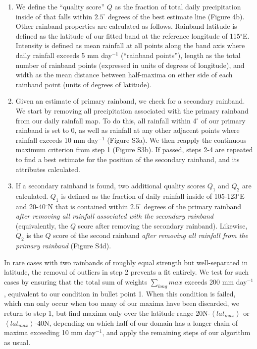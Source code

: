 \documentclass[draft,grl]{agutexSI}
\begin{document}
\begin{article}
\begin{enumerate}
	\item We define the ``quality score'' $Q$ as the fraction of total daily precipitation inside of  that falls within $2.5^{\circ}$ degrees of the best estimate line (Figure 4b). Other rainband properties are calculated as follows. Rainband latitude is defined as the latitude of our fitted band at the reference longitude of 115$^{\circ}$E. Intensity is defined as mean rainfall at all points along the band axis where daily rainfall exceeds 5 mm day$^{-1}$ (``rainband points''), length as the total number of rainband points (expressed in units of degrees of longitude), and width as the mean distance between half-maxima on either side of each rainband point (units of degrees of latitude).
	
	\item Given an estimate of primary rainband, we check for a secondary rainband. We start by removing all precipitation associated with the primary rainband from our daily rainfall map. To do this, all rainfall within 4$^{\circ}$ of our primary rainband is set to 0, as well as rainfall at any other adjacent points where rainfall exceeds 10 mm day$^{-1}$ (Figure S3a). We then reapply the continuous maximum criterion from step 1 (Figure S3b). If passed, steps 2-4 are repeated to find a best estimate for the position of the secondary rainband, and its attributes calculated.
	
	\item If a secondary rainband is found, two additional quality scores $Q_1$ and $Q_2$ are calculated. $Q_1$ is defined as the fraction of daily rainfall inside of 105-123$^{\circ}$E and 20-40$^{\circ}$N that is contained within $2.5^{\circ}$ degrees of the primary rainband \textit{after removing all rainfall associated with the secondary rainband} (equivalently, the $Q$ score after removing the secondary rainband). Likewise, $Q_2$ is the $Q$ score of the second rainband \textit{after removing all rainfall from the primary rainband} (Figure S4d).		
	
\end{enumerate} 

In rare cases with two rainbands of roughly equal strength but well-separated in latitude, the removal of outliers in step 2 prevents a fit entirely. We test for such cases by ensuring that the total sum of weights ${\sum_{long} max}$ exceeds 200 mm day$^{-1}$, equivalent to our condition in bullet point 1. When this condition is failed, which can only occur when too many of our maxima have been discarded, we return to step 1, but find maxima only over the latitude range 20N-$\left<lat_{max}\right>$ or $\left<lat_{max}\right>$-40N, depending on which half of our domain has a longer chain of maxima exceeding 10 mm day$^{-1}$, and apply the remaining steps of our algorithm as usual.


\end{article}
\end{document}
